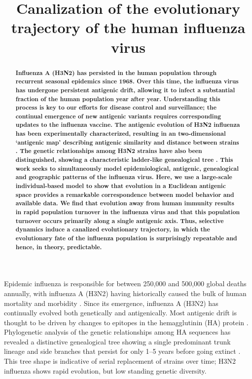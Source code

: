 \renewcommand{\thefigure}{Fig.~\arabic{figure}}
\renewcommand{\thetable}{Table~\arabic{table}}

\title{\Large \bf Canalization of the evolutionary trajectory of the human influenza virus}
\maketitle

\begin{abstract}
\noindent \bf Influenza A (H3N2) has persisted in the human population through recurrent seasonal epidemics since 1968.  Over this time, the influenza virus has undergone persistent antigenic drift, allowing it to infect a substantial fraction of the human population year after year.  Understanding this process is key to our efforts for disease control and surveillance; the continual emergence of new antigenic variants requires corresponding updates to the influenza vaccine.  The antigenic evolution of H3N2 influenza has been experimentally characterized, resulting in an two-dimensional `antigenic map' describing antigenic similarity and distance between strains \cite{Smith04}.  The genetic relationships among H3N2 strains have also been distinguished, showing a characteristic ladder-like genealogical tree \cite{Fitch97}.  This work seeks to simultaneously model epidemiological, antigenic, genealogical and geographic patterns of the influenza virus.  Here, we use a large-scale individual-based model to show that evolution in a Euclidean antigenic space provides a remarkable correspondence between model behavior and available data.  We find that evolution away from human immunity results in rapid population turnover in the influenza virus and that this population turnover occurs primarily along a single antigenic axis.  Thus, selective dynamics induce a canalized evolutionary trajectory, in which the evolutionary fate of the influenza population is surprisingly repeatable and hence, in theory, predictable.
\end{abstract}

Epidemic influenza is responsible for between 250,000 and 500,000 global deaths annually, with influenza A (H3N2) having historically caused the bulk of human mortality and morbidity \cite{flufactsheet}.  Since its emergence, influenza A (H3N2) has continually evolved both genetically and antigenically.  Most antigenic drift is thought to be driven by changes to epitopes in the hemagglutinin (HA) protein \cite{Nelson07NatRevGenet}.  Phylogenetic analysis of the genetic relationships among HA sequences has revealed a distinctive genealogical tree showing a single predominant trunk lineage and side branches that persist for only 1--5 years before going extinct \cite{Fitch97}.  This tree shape is indicative of serial replacement of strains over time; H3N2 influenza shows rapid evolution, but low standing genetic diversity.


